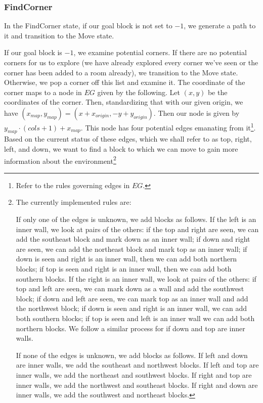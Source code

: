 \documentclass[12pt]{article}
\begin{document}
\subsubsection{FindCorner}

In the FindCorner state, if our goal block is not set to $ -1 $, we generate a path to it and transition to the Move state.

If our goal block is $ -1 $, we examine potential corners. If there are no potential corners for us to explore (we have already explored every corner we've seen or the corner has been added to a room already), we transition to the Move state. Otherwise, we pop a corner off this list and examine it. The coordinate of the corner maps to a node in $ EG $ given by the following. Let $ (x,y) $ be the coordinates of the corner. Then, standardizing that with our given origin, we have $ (x_{map}, y_{map}) = (x+x_{origin},-y+y_{origin}) $. Then our node is given by $ y_{map} \cdot (cols + 1) + x_{map} $. This node has four potential edges emanating from it\footnote{Refer to the rules governing edges in $ EG $.}. Based on the current status of these edges, which we shall refer to as top, right, left, and down, we want to find a block to which we can move to gain more information about the environment\footnote{The currently implemented rules are:

If only one of the edges is unknown, we add blocks as follows. If the left is an inner wall, we look at pairs of the others: if the top and right are seen, we can add the southeast block and mark down as an inner wall; if down and right are seen, we can add the northeast block and mark top as an inner wall; if down is seen and right is an inner wall, then we can add both northern blocks; if top is seen and right is an inner wall, then we can add both southern blocks. If the right is an inner wall, we look at pairs of the others: if top and left are seen, we can mark down as a wall and add the southwest block; if down and left are seen, we can mark top as an inner wall and add the northwest block; if down is seen and right is an inner wall, we can add both southern blocks; if top is seen and left is an inner wall we can add both northern blocks.  We follow a similar process for if down and top are inner walls.

If none of the edges is unknown, we add blocks as follows. If left and down are inner walls, we add the southeast and northwest blocks. If left and top are inner walls, we add the northeast and southwest blocks. If right and top are inner walls, we add the northwest and southeast blocks. If right and down are inner walls, we add the southwest and northeast blocks. 

}
\end{document}
